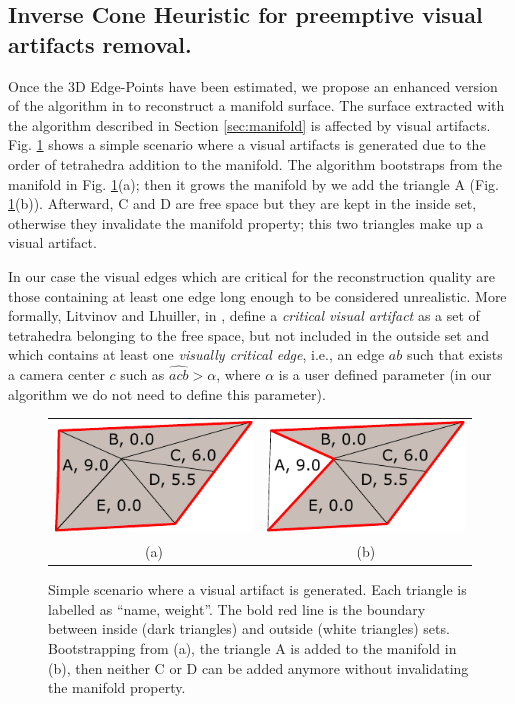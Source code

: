 \subsection{Inverse Cone Heuristic for preemptive visual artifacts removal.}
\label{sec:visualartifacts}
Once the 3D Edge-Points have been estimated, we propose an enhanced version of the algorithm in \cite{litvinov_lhuillier_13} to reconstruct a manifold surface.
The surface extracted with the algorithm described in Section \ref{sec:manifold} is affected by visual artifacts.
Fig. \ref{fig:artifact} shows a simple scenario where a visual artifacts is generated due to the order of tetrahedra addition to the manifold.
The algorithm bootstraps from the manifold in Fig. \ref{fig:artifact}(a); then it grows the manifold by we add the triangle A (Fig. \ref{fig:artifact}(b)). Afterward, C and D are free space but they are kept in the inside set, otherwise they invalidate the manifold property; this two triangles make up a visual artifact.

In our case the visual edges which are critical for the reconstruction quality are those containing at least one edge long enough to be considered unrealistic. 
More formally, Litvinov and Lhuiller, in \cite{litvinov_Lhiuller14}, define a \emph{critical visual artifact} as a set of tetrahedra belonging to the free space, but not included in the outside set and which contains at least one \emph{visually critical edge}, i.e., an edge $ab$ such that exists a camera center $c$ such as $\widehat{acb}>\alpha$, where $\alpha$ is a user defined parameter (in our algorithm we do not need to define this parameter).
\begin{figure}
\centering
\begin{tabular}{cc}
\includegraphics[width=0.35\columnwidth]{./img//artifacts01}&
\includegraphics[width=0.35\columnwidth]{./img//artifacts02}\\
(a) & (b)
\end{tabular}
\caption{Simple scenario where a visual artifact is generated. Each triangle is labelled as ``name, weight''. The bold red line is the boundary between inside (dark triangles) and outside (white triangles) sets. Bootstrapping from (a), the triangle A is added to the manifold in (b), then neither C or D can be added anymore without invalidating the manifold property.}
\label{fig:artifact}
\end{figure}


